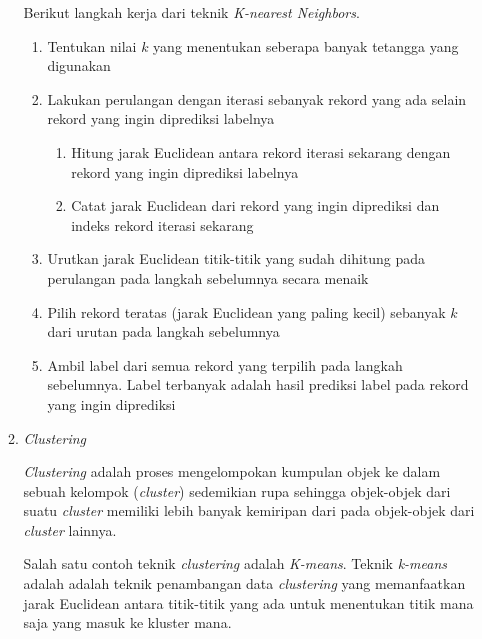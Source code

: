 \documentclass[a4paper,twoside]{article}
\begin{document}
\begin{enumerate}
\begin{enumerate}
			Berikut langkah kerja dari teknik \textit{K-nearest Neighbors}.
			\begin{enumerate}
				\item Tentukan nilai \(k\) yang menentukan seberapa banyak tetangga yang digunakan
				\item Lakukan perulangan dengan iterasi sebanyak rekord yang ada selain rekord yang ingin diprediksi labelnya
				\begin{enumerate}
					\item Hitung jarak Euclidean antara rekord iterasi sekarang dengan rekord yang ingin diprediksi labelnya
					\item Catat jarak Euclidean dari rekord yang ingin diprediksi dan indeks rekord iterasi sekarang
				\end{enumerate}
				\item Urutkan jarak Euclidean titik-titik yang sudah dihitung pada perulangan pada langkah sebelumnya secara menaik
				\item Pilih rekord teratas (jarak Euclidean yang paling kecil) sebanyak \(k\) dari urutan pada langkah sebelumnya
				\item Ambil label dari semua rekord yang terpilih pada langkah sebelumnya. Label terbanyak adalah hasil prediksi label pada rekord yang ingin diprediksi
			\end{enumerate}
			
			\item \textit{Clustering}
			
			\textit{Clustering} adalah proses mengelompokan kumpulan objek ke dalam sebuah kelompok (\textit{cluster}) sedemikian rupa sehingga objek-objek dari suatu \textit{cluster} memiliki lebih banyak kemiripan dari pada objek-objek dari \textit{cluster} lainnya. 

			Salah satu contoh teknik \textit{clustering} adalah \textit{K-means}. Teknik \textit{k-means} adalah adalah teknik penambangan data \textit{clustering} yang memanfaatkan jarak Euclidean antara titik-titik yang ada untuk menentukan titik mana saja yang masuk ke kluster mana.


\end{enumerate}
\end{enumerate}
\end{document}
